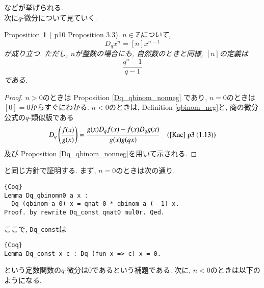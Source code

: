 \documentclass[11pt]{jarticle}
\theoremstyle{mystyle}
\newtheorem{prop}[df]{$\textrm{Proposition}$}
\newcommand{\bprop}{\begin{shadebox} \begin{prop}}
\newcommand{\eprop}{\end{prop} \end{shadebox}}
\newcommand{\bpf}{\begin{proof}}
\newcommand{\epf}{\end{proof}}
\newcommand{\Z}{\mathbb{Z}}
\newcommand{\0}{\textbf{0}}
\newcommand{\1}{\textbf{1}}
\newcommand{\2}{\textbf{2}}
\begin{document}
などが挙げられる. \\
次に$q$-微分について見ていく.  
\bprop[\cite{Kac} p10 Proposition 3.3]
  $n \in \Z$について, 
  \[
    D_q x^n = [n] x ^{n - 1}
  \]
  が成り立つ. ただし, $n$が整数の場合にも, 自然数のときと同様, $[n]$の定義は
  \[
    \frac{q^n - 1}{q - 1}
  \]
  である. 
\eprop
\bpf
  $n > 0$のときは Proposition \ref{Dq_qbinom_nonneg} であり, $n = 0$のときは$[0] = 0$からすぐにわかる. 
  $n < 0$のときは, Definition \ref{qbinom_neg}と, 商の微分公式の$q$-類似版である
  \[
    D_q \left( \frac{f(x)}{g(x)} \right) = \frac{g(x) D_q f(x) - f(x) D_q g(x)}{g(x) g(qx)} \quad
    \text{(\cite{Kac} p3 (1.13))}
  \]
  及び Proposition \ref{Dq_qbinom_nonneg}を用いて示される. 
\epf
\cite{Kac}と同じ方針で証明する. まず, $n = 0$のときは次の通り. 
\begin{lstlisting}{Coq}
Lemma Dq_qbinomn0 a x :
  Dq (qbinom a 0) x = qnat 0 * qbinom a (- 1) x.
Proof. by rewrite Dq_const qnat0 mul0r. Qed. \end{lstlisting}
ここで, {\tt Dq\_const}は
\begin{lstlisting}{Coq}
Lemma Dq_const x c : Dq (fun x => c) x = 0. \end{lstlisting}
という定数関数の$q$-微分は$0$であるという補題である. 次に, $n < 0$のときは以下のようになる. 
\end{document}
